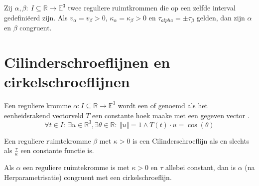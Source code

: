 \documentclass[main.tex]{subfiles}
\begin{document}
\begin{st}
  Zij $\alpha, \beta:\ I \subseteq \mathbb{R} \rightarrow \mathbb{E}^{3}$ twee reguliere ruimtkrommen die op een  zelfde interval gedefini\"eerd zijn.
  Als $v_{\alpha} = v_{\beta} > 0$, $\kappa_{\alpha} = \kappa_{\beta}>0$ en $\tau_{alpha} = \pm \tau_{\beta}$ gelden, dan zijn $\alpha$ en $\beta$ congruent.
\end{st}

\section{Cilinderschroeflijnen en cirkelschroeflijnen}
\label{sec:cilind-en-cirk}

\begin{de}
  Een reguliere kromme $\alpha: I \subseteq \mathbb{R} \rightarrow \mathbb{E}^{3}$ wordt een  of  genoemd als het eenheidsrakend vectorveld $T$ een constante hoek maake met een gegeven vector .
  \[ \forall t \in I:\ \exists u\in \mathbb{R}^{3}, \exists \theta \in \mathbb{R}:\ \Vert u \Vert = 1 \wedge T(t) \cdot u = \cos(\theta) \]
\end{de}

\begin{st}
  Een reguliere ruimtekromme $\beta$ met $\kappa>0$ is een Cilinderschroeflijn als en slechts als $\frac{\tau}{\kappa}$ een constante functie is.
\end{st}

\begin{st}
  Als $\alpha$ een reguliere ruimtekromme is met $\kappa>0$ en $\tau$ allebei constant, dan is $\alpha$ (na Herparametrisatie) congruent met een cirkelschroeflijn.
\end{st}
\end{document}
